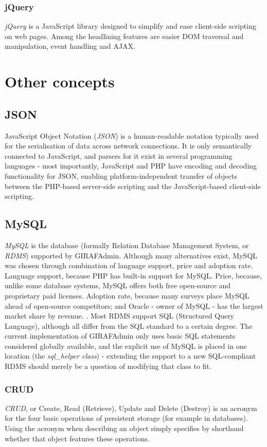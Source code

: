 \subsubsection*{jQuery}
\emph{jQuery} is a JavaScript library designed to simplify and ease client-side scripting on web pages. Among the headlining features are easier DOM traversal and manipulation, event handling and AJAX.

\section{Other concepts}

\subsection*{JSON}
JavaScript Object Notation (\emph{JSON}) is a human-readable notation typically used for the serialisation of data across network connections. It is only semantically connected to JavaScript, and parsers for it exist in several programming languages - most importantly, JavaScript and PHP have encoding and decoding functionality for JSON, enabling platform-independent transfer of objects between the PHP-based server-side scripting and the JavaScript-based client-side scripting.

\subsection*{MySQL}
\emph{MySQL} is the database (formally Relation Database Management System, or \emph{RDMS}) supported by GIRAFAdmin. Although many alternatives exist, MySQL was chosen through combination of language support, price and adoption rate. Language support, because PHP has built-in support for MySQL. Price, because, unlike some database systems, MySQL offers both free open-source and proprietary paid licenses. Adoption rate, because many surveys place MySQL ahead of open-source competitors; and Oracle - owner of MySQL - has the largest market share by revenue. \cite{mysqlpenetration}\cite{mysqlmarketshare}. Most RDMS support SQL (Structured Query Language), although all differ from the SQL standard to a certain degree. The current implementation of GIRAFAdmin only uses basic SQL statements considered globally available, and the explicit use of MySQL is placed in one location (the \emph{sql\_helper class}) - extending the support to a new SQL-compliant RDMS should merely be a question of modifying that class to fit.

\subsubsection*{CRUD}
\label{CRUD}
\emph{CRUD}, or Create, Read (Retrieve), Update and Delete (Destroy) is an acronym for the four basic operations of persistent storage (for example in databases). Using the acronym when describing an object simply specifies by shorthand whether that object features these operations.